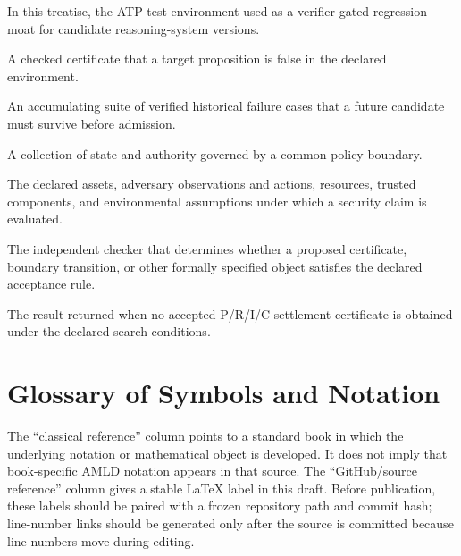 \documentclass[11pt,oneside]{book}
\theoremstyle{definition}
\theoremstyle{remark}
\begin{document}
\begin{description}[style=nextline,leftmargin=2.4em]
\item[Ocean] In this treatise, the ATP test environment used as a verifier-gated regression moat for candidate reasoning-system versions.
\item[Refutation] A checked certificate that a target proposition is false in the declared environment.
\item[Regression moat] An accumulating suite of verified historical failure cases that a future candidate must survive before admission.
\item[Security domain] A collection of state and authority governed by a common policy boundary.
\item[Threat model] The declared assets, adversary observations and actions, resources, trusted components, and environmental assumptions under which a security claim is evaluated.
\item[Verifier] The independent checker that determines whether a proposed certificate, boundary transition, or other formally specified object satisfies the declared acceptance rule.
\item[UNKNOWN] The result returned when no accepted P/R/I/C settlement certificate is obtained under the declared search conditions.
\end{description}

\chapter{Glossary of Symbols and Notation}
\label{app:symbol-glossary}
The ``classical reference'' column points to a standard book in which the underlying notation or mathematical object is developed. It does not imply that book-specific AMLD notation appears in that source. The ``GitHub/source reference'' column gives a stable LaTeX label in this draft. Before publication, these labels should be paired with a frozen repository path and commit hash; line-number links should be generated only after the source is committed because line numbers move during editing.
\end{document}

